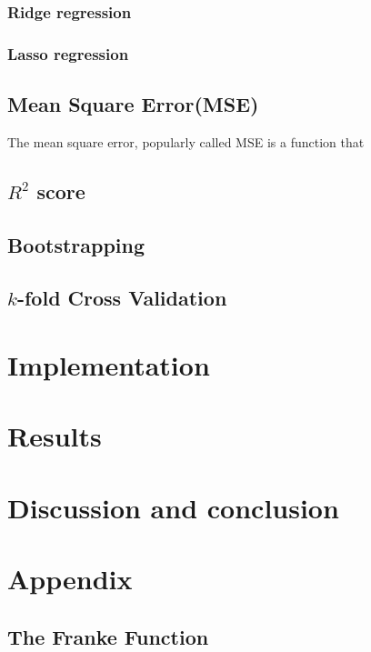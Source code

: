 \documentclass[11pt]{article}
\begin{document}
\subsubsection{Ridge regression}
\subsubsection{Lasso regression}

\subsection{Mean Square Error(MSE)}
The mean square error, popularly called MSE is a function that 
\subsection{\texorpdfstring{$R^2$}{R1} score}
\subsection{Bootstrapping}
\subsection{\texorpdfstring{$k$}{k}-fold Cross Validation}

\section{Implementation}
\section{Results}
\section{Discussion and conclusion}
\cite{scikit-learn}

\section{Appendix} \label{sec:appendix}
\subsection{The Franke Function}



\end{document}
